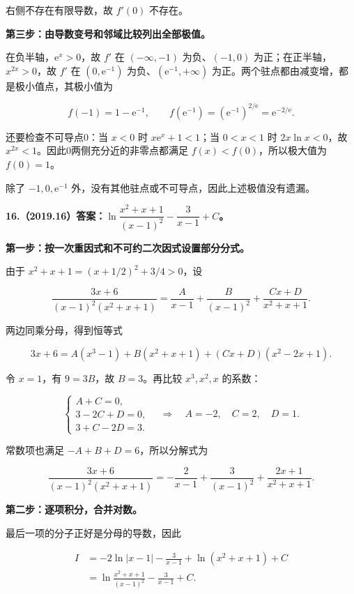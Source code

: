 \documentclass[UTF8,11pt,fontset=windows]{ctexart}
\begin{document}
右侧不存在有限导数，故 $f'(0)$ 不存在。

\textbf{第三步：由导数变号和邻域比较列出全部极值。}

在负半轴，$\mathrm e^x>0$，故 $f'$ 在 $(-\infty,-1)$ 为负、$(-1,0)$ 为正；在正半轴，$x^{2x}>0$，故 $f'$ 在 $(0,\mathrm e^{-1})$ 为负、$(\mathrm e^{-1},+\infty)$ 为正。两个驻点都由减变增，都是极小值点，其极小值为

$$
f(-1)=1-\mathrm e^{-1},
\qquad f(\mathrm e^{-1})=(\mathrm e^{-1})^{2/\mathrm e}=\mathrm e^{-2/\mathrm e}.
$$

还要检查不可导点0：当 $x<0$ 时 $x\mathrm e^x+1<1$；当 $0<x<1$ 时 $2x\ln x<0$，故 $x^{2x}<1$。因此0两侧充分近的非零点都满足 $f(x)<f(0)$，所以极大值为 $f(0)=1$。

除了 $-1,0,\mathrm e^{-1}$ 外，没有其他驻点或不可导点，因此上述极值没有遗漏。

\clearpage

\textbf{16.（2019.16）答案：$\ln\dfrac{x^2+x+1}{(x-1)^2}-\dfrac3{x-1}+C$。}

\textbf{第一步：按一次重因式和不可约二次因式设置部分分式。}

由于 $x^2+x+1=(x+1/2)^2+3/4>0$，设

$$
\frac{3x+6}{(x-1)^2(x^2+x+1)}
=\frac A{x-1}+\frac B{(x-1)^2}+\frac{Cx+D}{x^2+x+1}.
$$

两边同乘分母，得到恒等式

$$
3x+6=A(x^3-1)+B(x^2+x+1)+(Cx+D)(x^2-2x+1).
$$

令 $x=1$，有 $9=3B$，故 $B=3$。再比较 $x^3,x^2,x$ 的系数：

$$
\begin{cases}
A+C=0,\\
3-2C+D=0,\\
3+C-2D=3.
\end{cases}
\quad\Longrightarrow\quad
A=-2,\quad C=2,\quad D=1.
$$

常数项也满足 $-A+B+D=6$，所以分解式为

$$
\frac{3x+6}{(x-1)^2(x^2+x+1)}
=-\frac2{x-1}+\frac3{(x-1)^2}+\frac{2x+1}{x^2+x+1}.
$$

\textbf{第二步：逐项积分，合并对数。}

最后一项的分子正好是分母的导数，因此

$$
\begin{aligned}
I&=-2\ln|x-1|-\frac3{x-1}+\ln(x^2+x+1)+C\\
&=\boxed{\ln\frac{x^2+x+1}{(x-1)^2}-\frac3{x-1}+C}.
\end{aligned}
$$
\end{document}
